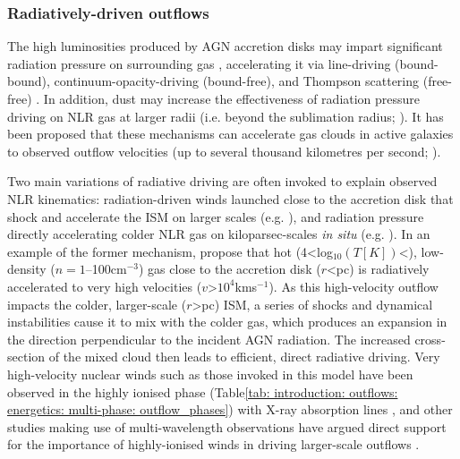 \subsubsection{Radiatively-driven outflows}
\label{section: introduction: outflows: accleration_mechanisms: radiation}

The high luminosities produced by AGN accretion disks may impart significant radiation pressure on surrounding gas \citep{Castor1975, Abbott1982}, accelerating it via line-driving (bound-bound), continuum-opacity-driving (bound-free), and Thompson scattering (free-free) \citep{Arav1994, Murray1995, Proga1998, Proga2000}. In addition, dust may increase the effectiveness of radiation pressure driving on NLR gas at larger radii (i.e. beyond the sublimation radius; \citealt{Dopita2002, Fabian2006}). It has been proposed that these mechanisms can accelerate gas clouds in active galaxies to observed outflow velocities (up to several thousand kilometres per second; \citealt{Crenshaw2000_N1068, Crenshaw2000_N4151, King2003, Das2005, Das2006, Hopkins2010, King2010, MullerSanchez2011, Meena2021}). 

Two main variations of radiative driving are often invoked to explain observed NLR kinematics: radiation-driven winds launched close to the accretion disk that shock and accelerate the ISM on larger scales (e.g. \citealt{Elvis2000, Proga2000, King2003}), and radiation pressure directly accelerating colder NLR gas on kiloparsec-scales \textit{in situ} (e.g. \citealt{Das2007, Fischer2017, Revalski2018, Meena2021, Meena2023}). In an example of the former mechanism, \citet{Hopkins2010} propose that hot (4\;\textless\;log$_{10}(T [K])$\;\textless{}), low-density ($n=1$--100\;cm$^{-3}$) gas close to the accretion disk ($r$\;\textless{}\;pc) is radiatively accelerated to very high velocities ($v$\;\textgreater\;$10^4$\;km\;s\;$^{-1}$). As this high-velocity outflow impacts the colder, larger-scale ($r$\;\textgreater{}\;pc) ISM, a series of shocks and dynamical instabilities cause it to mix with the colder gas, which produces an expansion in the direction perpendicular to the incident AGN radiation. The increased cross-section of the mixed cloud then leads to efficient, direct radiative driving. Very high-velocity nuclear winds such as those invoked in this model have been observed in the highly ionised phase (Table\;\ref{tab: introduction: outflows: energetics: multi-phase: outflow_phases}) with X-ray absorption lines \citep{Pounds2004, Lobban2011, Pounds2011, Tombesi2011}, and other studies making use of multi-wavelength observations have argued direct support for the importance of highly-ionised winds in driving larger-scale outflows \citep{Pounds2013, Feruglio2015}.

